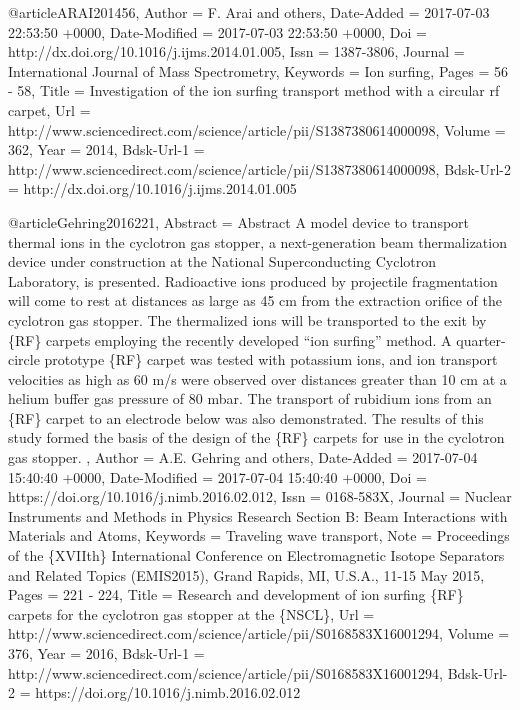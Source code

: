 {{{{{{{{{{@article{ARAI201456,
	Author = {F. Arai and others},
	Date-Added = {2017-07-03 22:53:50 +0000},
	Date-Modified = {2017-07-03 22:53:50 +0000},
	Doi = {http://dx.doi.org/10.1016/j.ijms.2014.01.005},
	Issn = {1387-3806},
	Journal = {International Journal of Mass Spectrometry},
	Keywords = {Ion surfing},
	Pages = {56 - 58},
	Title = {Investigation of the ion surfing transport method with a circular rf carpet},
	Url = {http://www.sciencedirect.com/science/article/pii/S1387380614000098},
	Volume = {362},
	Year = {2014},
	Bdsk-Url-1 = {http://www.sciencedirect.com/science/article/pii/S1387380614000098},
	Bdsk-Url-2 = {http://dx.doi.org/10.1016/j.ijms.2014.01.005}}

@article{Gehring2016221,
	Abstract = {Abstract A model device to transport thermal ions in the cyclotron gas stopper, a next-generation beam thermalization device under construction at the National Superconducting Cyclotron Laboratory, is presented. Radioactive ions produced by projectile fragmentation will come to rest at distances as large as 45 cm from the extraction orifice of the cyclotron gas stopper. The thermalized ions will be transported to the exit by \{RF\} carpets employing the recently developed ``ion surfing'' method. A quarter-circle prototype \{RF\} carpet was tested with potassium ions, and ion transport velocities as high as 60 m/s were observed over distances greater than 10 cm at a helium buffer gas pressure of 80 mbar. The transport of rubidium ions from an \{RF\} carpet to an electrode below was also demonstrated. The results of this study formed the basis of the design of the \{RF\} carpets for use in the cyclotron gas stopper. },
	Author = {A.E. Gehring and others},
	Date-Added = {2017-07-04 15:40:40 +0000},
	Date-Modified = {2017-07-04 15:40:40 +0000},
	Doi = {https://doi.org/10.1016/j.nimb.2016.02.012},
	Issn = {0168-583X},
	Journal = {Nuclear Instruments and Methods in Physics Research Section B: Beam Interactions with Materials and Atoms},
	Keywords = {Traveling wave transport},
	Note = {Proceedings of the \{XVIIth\} International Conference on Electromagnetic Isotope Separators and Related Topics (EMIS2015), Grand Rapids, MI, U.S.A., 11-15 May 2015},
	Pages = {221 - 224},
	Title = {Research and development of ion surfing \{RF\} carpets for the cyclotron gas stopper at the \{NSCL\}},
	Url = {http://www.sciencedirect.com/science/article/pii/S0168583X16001294},
	Volume = {376},
	Year = {2016},
	Bdsk-Url-1 = {http://www.sciencedirect.com/science/article/pii/S0168583X16001294},
	Bdsk-Url-2 = {https://doi.org/10.1016/j.nimb.2016.02.012}}

}}}}}}}}}}
